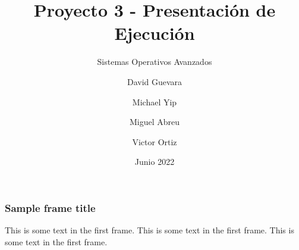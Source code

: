\documentclass{beamer}
\title[]{Proyecto 3 - Presentación de Ejecución}
\subtitle{Sistemas Operativos Avanzados}
\author[SOA - Proyecto 3]{David Guevara \and  Michael Yip \and Miguel Abreu \and Victor Ortiz}
\institute[]{Maestría en Computación \\ Tecnológico de Costa Rica}
\date{Junio 2022}
\begin{document}
\frame{\titlepage}

\begin{frame}
    \frametitle{Sample frame title}
    This is some text in the first frame. This is some text in the first frame. This is some text in the first frame.
\end{frame}



\end{document}
